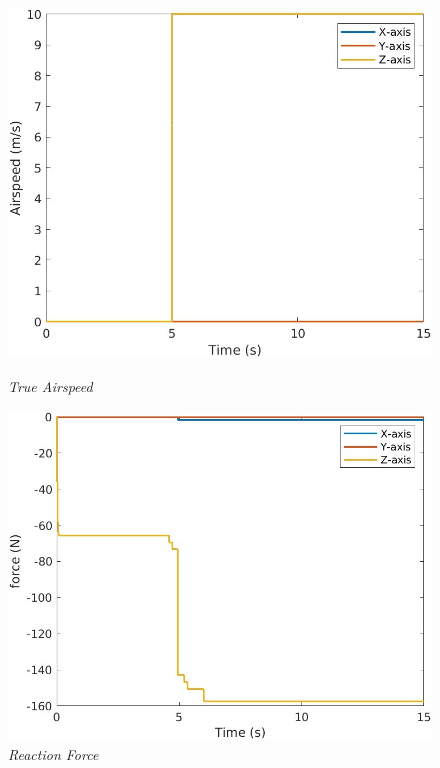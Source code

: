 \begin{figure}[htbp]
  \centering
  \begin{minipage}[b]{0.3\textwidth}
    \centering
    \includegraphics[width=\textwidth]{Images/Gust/FIXED/1 airspeed_4.jpg}
    \caption*{\textit{True Airspeed}}
  \end{minipage}
  \hfil
  \begin{minipage}[b]{0.3\textwidth}
    \centering
    \includegraphics[width=\textwidth]{Images/Gust/FIXED/2 force_4.jpg}
    \caption*{\textit{Reaction Force}}
  \end{minipage}
  \hfil
  \begin{minipage}[b]{0.3\textwidth}

\end{minipage}
\end{figure}
